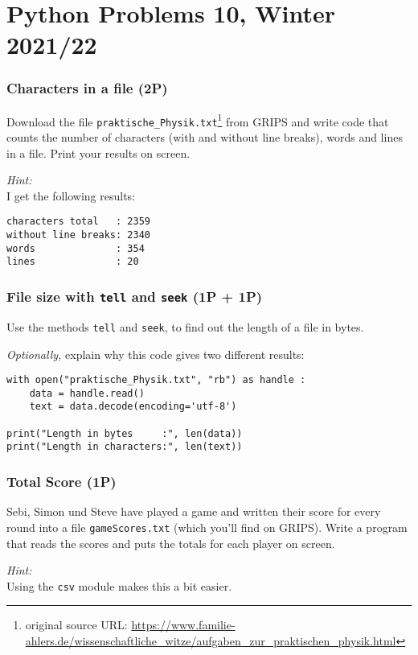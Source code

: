 \documentclass[
	ngerman,
	fontsize=10pt,
	parskip=half,
	titlepage=true,
	DIV=12
]{scrartcl}
\newcommand*{\inPy}[1]{\texttt{#1}}
\begin{document}
\part*{Python Problems 10, Winter 2021/22}
\section{Characters in a file (2\;P)}
Download the file \texttt{praktische\_Physik.txt}\footnote{original source URL: \url{https://www.familie-ahlers.de/wissenschaftliche_witze/aufgaben_zur_praktischen_physik.html}} from GRIPS and write code that counts the number of characters (with and without line breaks), words and lines in a file. Print your results on screen.

\emph{Hint:}\\
I get the following results:
\begin{verbatim}
characters total   : 2359
without line breaks: 2340
words              : 354
lines              : 20
\end{verbatim}


\section{File size with \inPy{tell} and \inPy{seek} (1\;P + 1\;P)}
Use the methods \inPy{tell} and \inPy{seek}, to find out the length of a file in bytes.

\emph{Optionally,} explain why this code gives two different results:
\begin{verbatim}
with open("praktische_Physik.txt", "rb") as handle :
    data = handle.read()
    text = data.decode(encoding='utf-8')

print("Length in bytes     :", len(data))
print("Length in characters:", len(text))
\end{verbatim}

\section{Total Score (1\;P)}
Sebi, Simon und Steve have played a game and written their score for every round into a file \texttt{gameScores.txt} (which you'll find on GRIPS). Write a program that reads the scores and puts the totals for each player on screen.

\emph{Hint:}\\
Using the \texttt{csv} module makes this a bit easier.
\end{document}
